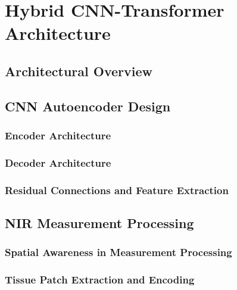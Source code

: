 
\chapter{Hybrid CNN-Transformer Architecture}

\section{Architectural Overview}

\section{CNN Autoencoder Design}

\subsection{Encoder Architecture}

\subsection{Decoder Architecture}

\subsection{Residual Connections and Feature Extraction}

\section{NIR Measurement Processing}

\subsection{Spatial Awareness in Measurement Processing}

\subsection{Tissue Patch Extraction and Encoding}

